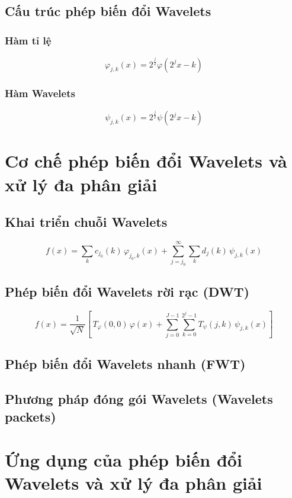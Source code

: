 \documentclass[12pt, a4paper]{report}
\begin{document}
\subsection{Cấu trúc phép biến đổi Wavelets}
\subsubsection*{Hàm tỉ lệ}

\begin{equation}
    \varphi _{j, k} (x) = 2 ^{\frac{j}{2}} \varphi (2^{j}x -k)
\end{equation}

\subsubsection*{Hàm Wavelets}

\begin{equation}
    \psi _{j, k} (x) = 2^{\frac{j}{2}} \psi (2^j x - k)
\end{equation}

\section{Cơ chế phép biến đổi Wavelets và xử lý đa phân giải}
\subsection{Khai triển chuỗi Wavelets}

\begin{equation}
    f(x)=\sum_{k} c_{j_0}(k)\,\varphi_{j_0,k}(x) + \sum_{j=j_0}^{\infty} \sum_{k} d_j(k)\,\psi_{j,k}(x)
\end{equation}

\subsection{Phép biến đổi Wavelets rời rạc (DWT)}

\begin{equation}
    f(x)=\frac{1}{\sqrt{N}}\left[\, T_{\varphi}(0,0)\,\varphi(x) + \sum_{j=0}^{J-1}\sum_{k=0}^{2^{j}-1} T_{\psi}(j,k)\,\psi_{j,k}(x) \right]
\end{equation}

\subsection{Phép biến đổi Wavelets nhanh (FWT)}
\subsection{Phương pháp đóng gói Wavelets (Wavelets packets)}

\section{Ứng dụng của phép biến đổi Wavelets và xử lý đa phân giải}
\end{document}
